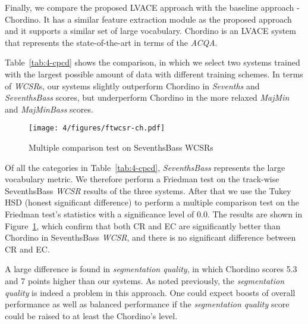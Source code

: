 Finally, we compare the proposed LVACE approach with the baseline approach - Chordino\cite{cannam2013mirex}. It has a similar feature extraction module as the proposed approach and it supports a similar set of large vocabulary. Chordino is an LVACE system that represents the state-of-the-art in terms of the \textit{ACQA}.

Table~\ref{tab:4-cpcd} shows the comparison, in which we select two systems trained with the largest possible amount of data with different training schemes. In terms of \textit{WCSR}s, our systems slightly outperform Chordino in \textit{Sevenths} and \textit{SeventhsBass} scores, but underperform Chordino in the more relaxed \textit{MajMin} and \textit{MajMinBass} scores.

\begin{figure}[h!]
	\centering
	\texttt{[image: 4/figures/ftwcsr-ch.pdf]}
	\caption{Multiple comparison test on SeventhsBass WCSRs}
	\label{fig:4-ftwcsr-ch}
\end{figure}
Of all the categories in Table~\ref{tab:4-cpcd}, \textit{SeventhsBass} represents the large vocabulary metric. We therefore perform a Friedman test on the track-wise SeventhsBass \textit{WCSR} results of the three systems. After that we use the Tukey HSD (honest significant difference) to perform a multiple comparison test on the Friedman test's statistics with a significance level of 0.0. The results are shown in Figure~\ref{fig:4-ftwcsr-ch}, which confirm that both CR and EC are significantly better than Chordino in SeventhsBass \textit{WCSR}, and there is no significant difference between CR and EC.

A large difference is found in \textit{segmentation quality}, in which Chordino scores 5.3 and 7 points higher than our systems. As noted previously, the \textit{segmentation quality} is indeed a problem in this approach. One could expect boosts of overall performance as well as balanced performance if the \textit{segmentation quality} score could be raised to at least the Chordino's level.

